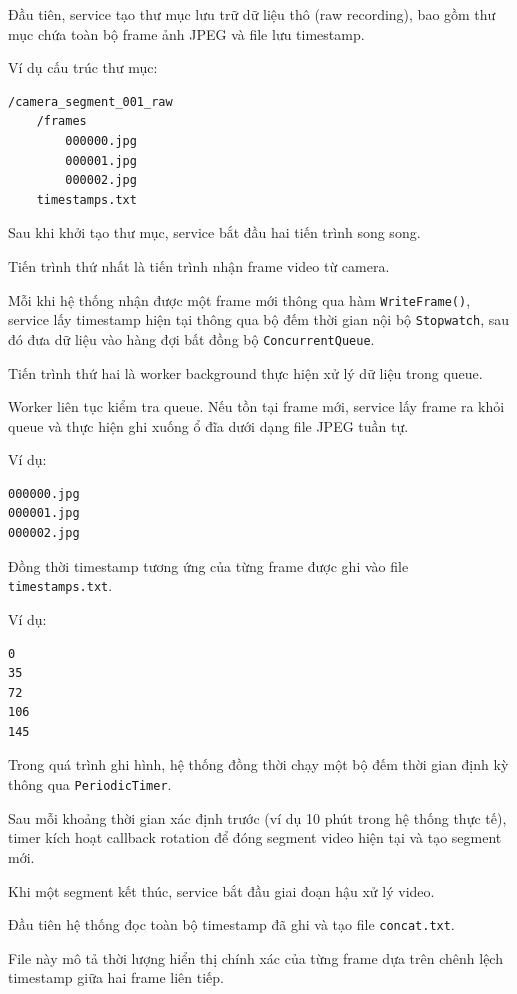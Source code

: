 \documentclass[../DoAn.tex]{subfiles}
\begin{document}
Đầu tiên, service tạo thư mục lưu trữ dữ liệu thô (raw recording), bao gồm thư mục chứa toàn bộ frame ảnh JPEG và file lưu timestamp.

Ví dụ cấu trúc thư mục:

\begin{verbatim}
/camera_segment_001_raw
    /frames
        000000.jpg
        000001.jpg
        000002.jpg
    timestamps.txt
\end{verbatim}

Sau khi khởi tạo thư mục, service bắt đầu hai tiến trình song song.

Tiến trình thứ nhất là tiến trình nhận frame video từ camera.

Mỗi khi hệ thống nhận được một frame mới thông qua hàm \texttt{WriteFrame()}, service lấy timestamp hiện tại thông qua bộ đếm thời gian nội bộ \texttt{Stopwatch}, sau đó đưa dữ liệu vào hàng đợi bất đồng bộ \texttt{ConcurrentQueue}.

Tiến trình thứ hai là worker background thực hiện xử lý dữ liệu trong queue.

Worker liên tục kiểm tra queue. Nếu tồn tại frame mới, service lấy frame ra khỏi queue và thực hiện ghi xuống ổ đĩa dưới dạng file JPEG tuần tự.

Ví dụ:

\begin{verbatim}
000000.jpg
000001.jpg
000002.jpg
\end{verbatim}

Đồng thời timestamp tương ứng của từng frame được ghi vào file \texttt{timestamps.txt}.

Ví dụ:

\begin{verbatim}
0
35
72
106
145
\end{verbatim}

Trong quá trình ghi hình, hệ thống đồng thời chạy một bộ đếm thời gian định kỳ thông qua \texttt{PeriodicTimer}.

Sau mỗi khoảng thời gian xác định trước (ví dụ 10 phút trong hệ thống thực tế), timer kích hoạt callback rotation để đóng segment video hiện tại và tạo segment mới.

Khi một segment kết thúc, service bắt đầu giai đoạn hậu xử lý video.

Đầu tiên hệ thống đọc toàn bộ timestamp đã ghi và tạo file \texttt{concat.txt}.

File này mô tả thời lượng hiển thị chính xác của từng frame dựa trên chênh lệch timestamp giữa hai frame liên tiếp.
\end{document}
